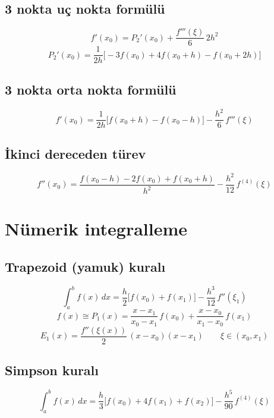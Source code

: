 \documentclass[11pt,a4paper]{article}
\begin{document}
\subsection{3 nokta uç nokta formülü}
\[ f'(x_0) = P_2'(x_0) + \frac{f'''(\xi)}{6}\,2h^2 \]
\[ P_2'(x_0) = \frac{1}{2h}\bigl[-3f(x_0) + 4f(x_0 + h) - f(x_0 + 2h)\bigr] \]

\subsection{3 nokta orta nokta formülü}
\[ f'(x_0) = \frac{1}{2h}\bigl[f(x_0 + h) - f(x_0 - h)\bigr] - \frac{h^2}{6}\,f'''(\xi) \]

\subsection{İkinci dereceden türev}
\[ f''(x_0) = \frac{f(x_0 - h) - 2f(x_0) + f(x_0 + h)}{h^2} - \frac{h^2}{12}\,f^{(4)}(\xi) \]

\section{Nümerik integralleme}
\subsection{Trapezoid (yamuk) kuralı}
\begin{center}
\end{center}
\[ \int_a^b f(x)\,dx = \frac{h}{2}\bigl[f(x_0) + f(x_1)\bigr] - \frac{h^3}{12}\,f''(\xi_1) \]
\[ f(x) \cong P_1(x) = \frac{x - x_1}{x_0 - x_1}\,f(x_0) + \frac{x - x_0}{x_1 - x_0}\,f(x_1) \]
\[ E_1(x) = \frac{f''(\xi(x))}{2}\,(x - x_0)(x - x_1) \qquad \xi \in (x_0, x_1) \]

\subsection{Simpson kuralı}
\[
  \int_a^b f(x)\,dx = \frac{h}{3}\bigl[f(x_0) + 4f(x_1) + f(x_2)\bigr] - \frac{h^5}{90}\,f^{(4)}(\xi)
\]
\end{document}
